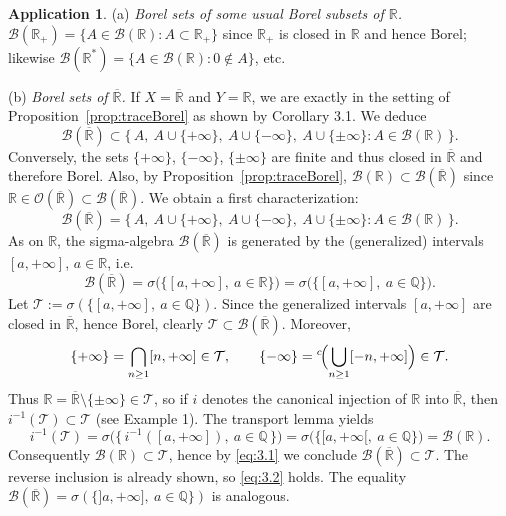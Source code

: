 \documentclass[11pt]{article}
\theoremstyle{definition}
\newtheorem{application}{Application}[section]
\begin{document}
\begin{application}
(a) \emph{Borel sets of some usual Borel subsets of $\mathbb R$.}
$\mathcal B(\mathbb R_+)=\{A\in\mathcal B(\mathbb R): A\subset \mathbb R_+\}$ since $\mathbb R_+$ is closed in $\mathbb R$ and hence Borel; likewise $\mathcal B(\mathbb R^\ast)=\{A\in\mathcal B(\mathbb R): 0\notin A\}$, etc.

(b) \emph{Borel sets of $\overline{\mathbb R}$.}
If $X=\overline{\mathbb R}$ and $Y=\mathbb R$, we are exactly in the setting of Proposition~\ref{prop:traceBorel} as shown by Corollary 3.1. We deduce
\[
\mathcal B(\overline{\mathbb R})\subset\{\,A,\ A\cup\{+\infty\},\ A\cup\{-\infty\},\ A\cup\{\pm\infty\}: A\in\mathcal B(\mathbb R)\,\}.
\]
Conversely, the sets $\{+\infty\}$, $\{-\infty\}$, $\{\pm\infty\}$ are finite and thus closed in $\overline{\mathbb R}$ and therefore Borel. Also, by Proposition~\ref{prop:traceBorel}, $\mathcal B(\mathbb R)\subset \mathcal B(\overline{\mathbb R})$ since $\mathbb R\in\mathcal O(\overline{\mathbb R})\subset\mathcal B(\overline{\mathbb R})$. We obtain a first characterization:
\begin{equation}\label{eq:3.1}
\mathcal B(\overline{\mathbb R})=\{\,A,\ A\cup\{+\infty\},\ A\cup\{-\infty\},\ A\cup\{\pm\infty\}: A\in\mathcal B(\mathbb R)\,\}.
\end{equation}
As on $\mathbb R$, the sigma-algebra $\mathcal B(\overline{\mathbb R})$ is generated by the (generalized) intervals $[a,+\infty]$, $a\in\mathbb R$, i.e.
\begin{equation}\label{eq:3.2}
\mathcal B(\overline{\mathbb R})=\sigma\bigl(\{[a,+\infty],\ a\in\mathbb R\}\bigr)=\sigma\bigl(\{[a,+\infty],\ a\in\mathbb Q\}\bigr).
\end{equation}
Let $\mathcal T:=\sigma(\{[a,+\infty],\ a\in\mathbb Q\})$. Since the generalized intervals $[a,+\infty]$ are closed in $\overline{\mathbb R}$, hence Borel, clearly $\mathcal T\subset\mathcal B(\overline{\mathbb R})$. Moreover,
\[
\{+\infty\}=\bigcap_{n\ge1} [n,+\infty]\in\mathcal T,
\qquad
\{-\infty\}={}^c\!\Bigl(\bigcup_{n\ge1}[-n,+\infty]\Bigr)\in\mathcal T.
\]
Thus $\mathbb R=\overline{\mathbb R}\setminus\{\pm\infty\}\in\mathcal T$, so if $i$ denotes the canonical injection of $\mathbb R$ into $\overline{\mathbb R}$, then $i^{-1}(\mathcal T)\subset\mathcal T$ (see Example 1). The transport lemma yields
\[
i^{-1}(\mathcal T)
= \sigma\bigl(\{\,i^{-1}([a,+\infty]),\ a\in\mathbb Q\,\}\bigr)
= \sigma\bigl(\{[a,+\infty[,\ a\in\mathbb Q\}\bigr)
= \mathcal B(\mathbb R).
\]
Consequently $\mathcal B(\mathbb R)\subset\mathcal T$, hence by \eqref{eq:3.1} we conclude $\mathcal B(\overline{\mathbb R})\subset\mathcal T$. The reverse inclusion is already shown, so \eqref{eq:3.2} holds. The equality $\mathcal B(\overline{\mathbb R})=\sigma(\{]a,+\infty],\ a\in\mathbb Q\})$ is analogous.
\end{application}
\end{document}
